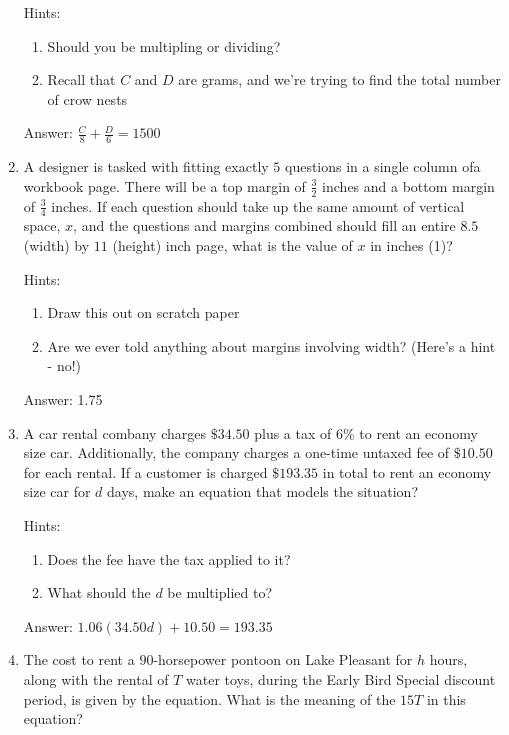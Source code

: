 \documentclass{article}
\begin{document}
\begin{enumerate}
{	      Hints:
	      \begin{enumerate}
		      \item{Should you be multipling or dividing?}
		      \item{Recall that $C$ and $D$ are grams, and we're trying to find the total number of crow nests}
	      \end{enumerate}

	      Answer: \(\frac{C}{8}+\frac{D}{6}=1500\)
	      }

	\item{A designer is tasked with fitting exactly $5$ questions in a single column ofa workbook page. There will be a top margin of $\frac{3}{2}$ inches and a bottom margin of $\frac{3}{4}$ inches. If each question should take up the same amount of vertical space, $x$, and the questions and margins combined should fill an entire $8.5$ (width) by $11$ (height) inch page, what is the value of $x$ in inches (1)?

	      Hints:
	      \begin{enumerate}
		      \item{Draw this out on scratch paper}
		      \item {Are we ever told anything about margins involving width? (Here's a hint - no!)}
	      \end{enumerate}

	      Answer: 1.75
	      }

	\item{A car rental combany charges $\$34.50$ plus a tax of $6\%$ to rent an economy size car. Additionally, the company charges a one-time untaxed fee of $\$10.50$ for each rental. If a customer is charged $\$193.35$ in total to rent an economy size car for $d$ days, make an equation that models the situation?

	      Hints:
	      \begin{enumerate}
		      \item{Does the fee have the tax applied to it?}
		      \item{What should the $d$ be multiplied to?}
	      \end{enumerate}

	      Answer: \(1.06(34.50d)+10.50=193.35\)}

	\item {The cost to rent a $90$-horsepower pontoon on Lake Pleasant for $h$ hours, along with the rental of $T$ water toys, during the Early Bird Special discount period, is given by the equation. What is the meaning of the $15T$ in this equation?

}
\end{enumerate}
\end{document}
